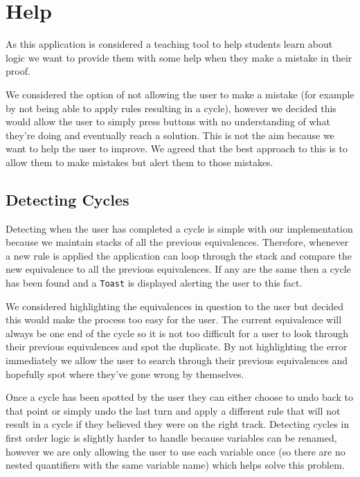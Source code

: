 \documentclass[draft]{report}
\begin{document}
\section{Help}

As this application is considered a teaching tool to help students learn about logic we want to provide them with some help when they make a mistake in their proof.

We considered the option of not allowing the user to make a mistake (for example by not being able to apply rules resulting in a cycle), however we decided this would allow the user to simply press buttons with no understanding of what they're doing and eventually reach a solution. This is not the aim because we want to help the user to improve. We agreed that the best approach to this is to allow them to make mistakes but alert them to those mistakes.

\subsection{Detecting Cycles}
\label{sub:detecting_cycles}

Detecting when the user has completed a cycle is simple with our implementation because we maintain stacks of all the previous equivalences. Therefore, whenever a new rule is applied the application can loop through the stack and compare the new equivalence to all the previous equivalences. If any are the same then a cycle has been found and a {\tt Toast} is displayed alerting the user to this fact.

We considered highlighting the equivalences in question to the user but decided this would make the process too easy for the user. The current equivalence will always be one end of the cycle so it is not too difficult for a user to look through their previous equivalences and spot the duplicate. By not highlighting the error immediately we allow the user to search through their previous equivalences and hopefully spot where they've gone wrong by themselves.

Once a cycle has been spotted by the user they can either choose to undo back to that point or simply undo the last turn and apply a different rule that will not result in a cycle if they believed they were on the right track. Detecting cycles in first order logic is slightly harder to handle because variables can be renamed, however we are only allowing the user to use each variable once (so there are no nested quantifiers with the same variable name) which helps solve this problem.
\end{document}
